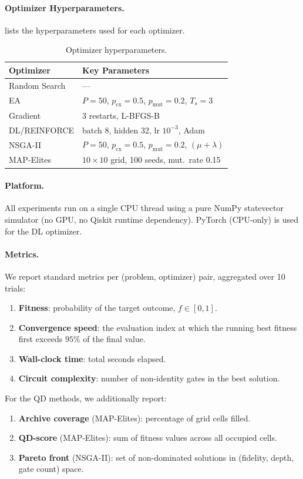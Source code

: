 \documentclass[twocolumn,11pt]{article}
\begin{document}
\paragraph{Optimizer Hyperparameters.}
 lists the hyperparameters used for each optimizer.

\begin{table}[t]
\centering
\caption{Optimizer hyperparameters.}
\label{tab:hyperparams}
\small
\begin{tabular}{@{}ll@{}}
\toprule
\textbf{Optimizer} & \textbf{Key Parameters} \\
\midrule
Random Search & --- \\
EA            & $P{=}50$, $p_\text{cx}{=}0.5$, $p_\text{mut}{=}0.2$, $T_s{=}3$ \\
Gradient      & 3 restarts, L-BFGS-B \\
DL/REINFORCE  & batch 8, hidden 32, lr $10^{-3}$, Adam \\
NSGA-II       & $P{=}50$, $p_\text{cx}{=}0.5$, $p_\text{mut}{=}0.2$, $(\mu{+}\lambda)$ \\
MAP-Elites    & $10{\times}10$ grid, 100 seeds, mut.\ rate 0.15 \\
\bottomrule
\end{tabular}
\end{table}

\paragraph{Platform.}
All experiments run on a single CPU thread using a pure NumPy statevector
simulator (no GPU, no Qiskit runtime dependency).  PyTorch (CPU-only) is used
for the DL optimizer.

\paragraph{Metrics.}
We report standard metrics per (problem, optimizer) pair, aggregated over 10 trials:
\begin{enumerate}[nosep]
    \item \textbf{Fitness}: probability of the target outcome, $f \in [0, 1]$.
    \item \textbf{Convergence speed}: the evaluation index at which the running
          best fitness first exceeds $95\%$ of the final value.
    \item \textbf{Wall-clock time}: total seconds elapsed.
    \item \textbf{Circuit complexity}: number of non-identity gates in the best
          solution.
\end{enumerate}
For the QD methods, we additionally report:
\begin{enumerate}
    \item \textbf{Archive coverage} (MAP-Elites): percentage of grid cells
          filled.
    \item \textbf{QD-score} (MAP-Elites): sum of fitness values across all
          occupied cells.
    \item \textbf{Pareto front} (NSGA-II): set of non-dominated solutions in
          (fidelity, depth, gate count) space.
\end{enumerate}
\end{document}
